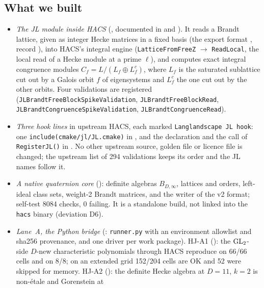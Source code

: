 \subsection{What we built}\label{ss:hacs}
\begin{itemize}
\item \emph{The JL module inside HACS} (, documented in 
  and ). It reads a Brandt lattice, given as integer Hecke matrices in a fixed basis (the export
  format , record ), into HACS's integral engine
  (\texttt{LatticeFromFreeZ} $\to$ \texttt{ReadLocal}, the local read of a Hecke module at a prime $\ell$), and computes
  exact integral congruence modules $C_f=L/(L_f\oplus L_f^c)$, where $L_f$ is the saturated sublattice cut out by a Galois
  orbit $f$ of eigensystems and $L_f^c$ the one cut out by the other orbits. Four validations are registered
  (\texttt{JLBrandtFreeBlockSpikeValidation}, \texttt{JLBrandtFreeBlockRead}, \texttt{JLBrandtCongruenceSpikeValidation},
  \texttt{JLBrandtCongruenceRead}).
\item \emph{Three hook lines} in upstream HACS, each marked \texttt{Langlandscape JL hook}: one \texttt{include(cmake/jl/JL.cmake)}
  in , and the declaration and the call of \texttt{RegisterJL()} in
  . No other upstream source, golden file or licence file is changed; the
  upstream list of 294 validations keeps its order and the JL names follow it.
\item \emph{A native quaternion core} (): definite algebras $B_{D,\infty}$, lattices and orders,
  left-ideal class sets, weight-2 Brandt matrices, and the writer  of the v2 format; self-test
  8084 checks, 0 failing. It is a standalone build, not linked into the \texttt{hacs} binary (deviation D6).
\item \emph{Lane~A, the Python bridge} (: \texttt{runner.py} with an
  environment allowlist and sha256 provenance, and one driver per work package). HJ-A1 (): the
  $\mathrm{GL}_2$-side $D$-new characteristic polynomials through HACS reproduce  on 66/66 cells and
   on 8/8; on an extended grid 152/204 cells are OK and 52 were skipped for memory. HJ-A2
  (): the definite Hecke algebra at $D=11$, $k=2$ is non-\'etale and Gorenstein at

\end{itemize}

